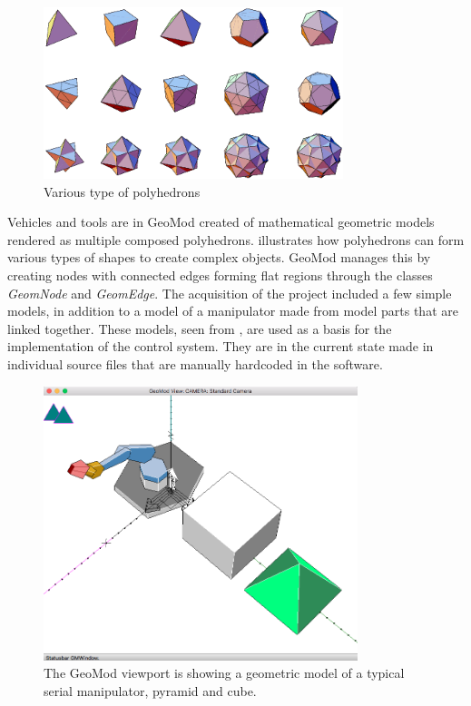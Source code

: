 \begin{figure}[ht]
    \centering
    \includegraphics[height=5cm]{images/poly.png}
    \caption[Various type of polyhedrons \cite{polyhedrons}]{Various type of polyhedrons \cite{polyhedrons}}
    \label{fig:polyhedrons}
\end{figure}

Vehicles and tools are in GeoMod created of mathematical geometric models rendered as multiple composed polyhedrons.  illustrates how polyhedrons can form various types of shapes to create complex objects. GeoMod manages this by creating nodes with connected edges forming flat regions through the classes \textit{GeomNode} and \textit{GeomEdge}. The acquisition of the project included a few simple models, in addition to a model of a manipulator made from model parts that are linked together. These models, seen from , are used as a basis for the implementation of the control system. They are in the current state made in individual source files that are manually hardcoded in the software. 

\begin{figure}[ht]
    \centering
    \includegraphics[height=8cm]{images/Models.png}
    \caption[The GeoMod viewport is showing a geometric model of a typical serial manipulator, pyramid and cube]{The GeoMod viewport is showing a geometric model of a typical serial manipulator, pyramid and cube.}
    \label{fig:viewport}
\end{figure}

